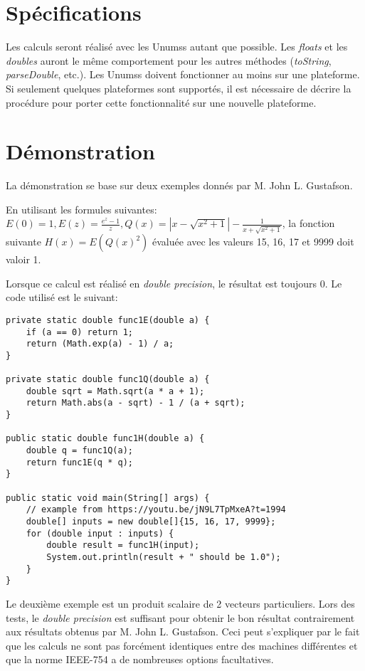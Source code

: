 \section{Spécifications}

Les calculs seront réalisé avec les \glspl{Unums} autant que possible. Les \textit{floats} et les \textit{doubles} auront le même comportement pour les autres méthodes (\textit{toString}, \textit{parseDouble}, etc.). Les \glspl{Unums} doivent fonctionner au moins sur une plateforme. Si seulement quelques plateformes sont supportés, il est nécessaire de décrire la procédure pour porter cette fonctionnalité sur une nouvelle plateforme.

\section{Démonstration}

La démonstration se base sur deux exemples donnés par M. John L. Gustafson.

En utilisant les formules suivantes: $E(0) = 1, E(z) = \frac{e^z - 1}{z}, Q(x) = |x - \sqrt{x^2 + 1}| - \frac{1}{x+\sqrt{x^2 + 1}}$, la fonction suivante $H(x) = E(Q(x)^2)$ évaluée avec les valeurs 15, 16, 17 et 9999 doit valoir 1.

Lorsque ce calcul est réalisé en \textit{double precision}, le résultat est toujours 0. Le code utilisé est le suivant:

\begin{verbatim}
private static double func1E(double a) {
    if (a == 0) return 1;
    return (Math.exp(a) - 1) / a;
}

private static double func1Q(double a) {
    double sqrt = Math.sqrt(a * a + 1);
    return Math.abs(a - sqrt) - 1 / (a + sqrt);
}

public static double func1H(double a) {
    double q = func1Q(a);
    return func1E(q * q);
}

public static void main(String[] args) {
    // example from https://youtu.be/jN9L7TpMxeA?t=1994
    double[] inputs = new double[]{15, 16, 17, 9999};
    for (double input : inputs) {
        double result = func1H(input);
        System.out.println(result + " should be 1.0");
    }
}
\end{verbatim}

Le deuxième exemple est un produit scalaire de 2 vecteurs particuliers. Lors des tests, le \textit{double precision} est suffisant pour obtenir le bon résultat contrairement aux résultats obtenus par M. John L. Gustafson. Ceci peut s'expliquer par le fait que les calculs ne sont pas forcément identiques entre des machines différentes et que la norme IEEE-754 \cite{ieee-754-2019} a de nombreuses options facultatives.

